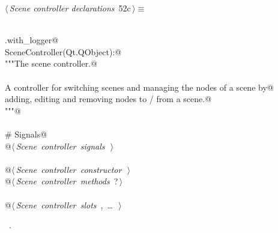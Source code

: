 \documentclass[
    a4paper,      %
    10pt,         %
    openright,    %
    notitlepage,  %
    parskip=half, %
]{scrreprt}       %
\theoremstyle{definition}                    %
\begin{document}
\begin{flushleft} \small
\begin{minipage}{\linewidth}\label{scrap78}\raggedright\small
{} $\langle\,${\itshape Scene controller declarations}\nobreak\ {\footnotesize {52c}}$\,\rangle\equiv$
\vspace{-1exm}
\begin{list}{}{} \item
\mbox{}\lstinline@@\\
\mbox{}\lstinline@common.with_logger@\\
\mbox{}\lstinline@class SceneController(Qt.QObject):@\\
\mbox{}\lstinline@    """The scene controller.@\\
\mbox{}\lstinline@@\\
\mbox{}\lstinline@    A controller for switching scenes and managing the nodes of a scene by@\\
\mbox{}\lstinline@    adding, editing and removing nodes to / from a scene.@\\
\mbox{}\lstinline@    """@\\
\mbox{}\lstinline@@\\
\mbox{}\lstinline@    # Signals@\\
\mbox{}\lstinline@    @\hbox{$\langle\,${\itshape Scene controller signals}\nobreak\ {\footnotesize {}}$\,\rangle$}\lstinline@@\\
\mbox{}\lstinline@@\\
\mbox{}\lstinline@    @\hbox{$\langle\,${\itshape Scene controller constructor}\nobreak\ {\footnotesize {}}$\,\rangle$}\lstinline@@\\
\mbox{}\lstinline@    @\hbox{$\langle\,${\itshape Scene controller methods}\nobreak\ {\footnotesize ?}$\,\rangle$}\lstinline@@\\
\mbox{}\lstinline@@\\
\mbox{}\lstinline@    @\hbox{$\langle\,${\itshape Scene controller slots}\nobreak\ {\footnotesize {}, \ldots\ }$\,\rangle$}\lstinline@@\\
\mbox{}\lstinline@@{\NWsep}
\end{list}
\vspace{-1.5ex}
\footnotesize
\begin{list}{}{\setlength{\itemsep}{-\parsep}\setlength{\itemindent}{-\leftmargin}}
\item \NWtxtMacroRefIn\ .

\item{}
\end{list}
\end{minipage}\vspace{4ex}
\end{flushleft}
\end{document}
